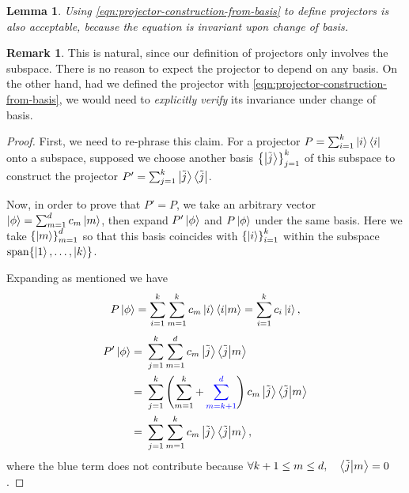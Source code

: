 \documentclass{article}
\theoremstyle{definition}
\newtheorem{rem}{Remark}[section]
\theoremstyle{plain}
\newtheorem{lem}{Lemma}[section]
\numberwithin{equation}{section}
\begin{document}
\begin{lem}
    Using \cref{eqn:projector-construction-from-basis} 
    to define projectors is also acceptable, 
    because the equation is invariant upon 
    change of basis. 
\end{lem}

\begin{rem}
    This is natural, 
    since our definition of projectors only involves 
    the subspace. 
    There is no reason to expect the projector 
    to depend on any basis. 
    On the other hand, had we defined the projector 
    with \cref{eqn:projector-construction-from-basis}, 
    we would need to 
    \textit{explicitly verify} its invariance 
    under change of basis.
\end{rem}

\begin{proof}
    First, we need to re-phrase this claim. 
    For a projector 
    $P = \sum_{i = 1}^{k} \ket{i} \bra{i}$
    onto a subspace, supposed we choose another basis 
    $\left\{ \ket{\tilde{j}} \right\}_{j = 1}^{k}$ 
    of this subspace to construct the projector 
    $P' = 
    \sum_{j = 1}^{k} \ket{\tilde{j}} \bra{\tilde{j}}$.

    Now, in order to prove that 
    $P' = P$, 
    we take an arbitrary vector 
    $\ket{\phi} = 
    \sum_{m =1}^{d}c_m \ket{m}$, 
    then expand $P' \ket{\phi}$ and 
    $P \ket{\phi}$ under the same basis. 
    Here we take 
    $\left\{ \ket{m} \right\}_{m = 1}^{d}$ 
    so that this basis coincides with 
    $\left\{ \ket{i} \right\}_{i = 1}^{k}$ 
    within the subspace 
    $\operatorname{span} \{ \ket{1}, \ldots , \ket{k}\}$. 

    Expanding as mentioned we have 
    \begin{equation}
        P \ket{\phi}
        =
        \sum_{i = 1}^{k}
        \sum_{m = 1}^{k}
        c_m \ket{i} \bra{i} \ket{m}
        = \sum_{i = 1}^{k} c_i \ket{i},
    \end{equation}
    \begin{align}
        P' \ket{\phi} 
        =&\ 
        \sum_{j=1}^{k}\sum_{m=1}^{d}
        c_m \ket{\tilde{j}} \bra{\tilde{j}} \ket{m} \\
        =&\ 
        \sum_{j=1}^{k}
        \left( 
            \sum_{m=1}^{k}
            +
        \mathcolor{blue}{
            \sum_{m=k+1}^{d}
        }
         \right) 
        c_m \ket{\tilde{j}} \bra{\tilde{j}} \ket{m} \\
        =&\ 
        \sum_{j=1}^{k}\sum_{m=1}^{k}
        c_m \ket{\tilde{j}} \bra{\tilde{j}} \ket{m},
    \label{eqn:expansion-of-P-prime-phi-ket}
    \end{align}
    where the blue term does not contribute because 
    $\forall k+1 \le m \le d,\quad 
    \bra{\tilde{j}} \ket{m} =0$.
    

\end{proof}
\end{document}
